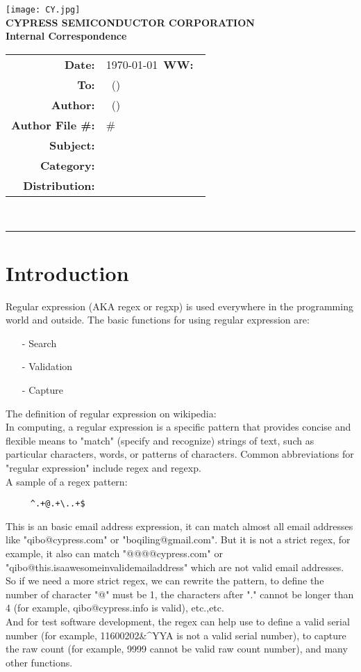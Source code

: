 \documentclass{article}
\renewcommand{\maketitle}
{
	\begin{center}
	\texttt{[image: CY.jpg]}\\
	\vspace{5 mm}
	\large
	{
	\textbf{CYPRESS SEMICONDUCTOR CORPORATION}\\
	\textbf{Internal Correspondence}\\
	}
	\vspace{1 mm}
	\hspace{0.5 in}
	\begin{tabular}{rl}
	\bf Date: & \today\ \hspace{2 in}\textbf{WW:\ }\WorkWeek\\
	\bf To: & \BossName\ (\BossInitials)\\
	\bf Author: & \Author\ (\AuthorInitials)\\
	\bf Author File \#: & \AuthorInitials\#\MemoNumber\\
	\bf Subject: & \Subject\\
	\bf Category: & \Category\\
	\bf Distribution: & \Distribution\\
	\end{tabular}
	\vspace{3 mm}\\
	\hrule
	\end{center}
	
	\thispagestyle{firstpage}
	\pagestyle{normalpage}
}
\begin{document}
\maketitle


\section{Introduction}

Regular expression (AKA regex or regxp) is used everywhere in the programming world and outside. The basic functions for using regular expression are:

\begin{itemize}
\item[-]
	Search
\item[-]
	Validation
\item[-]
	Capture	
\end{itemize}

The definition of regular expression on wikipedia: \\
In computing, a regular expression is a specific pattern that provides concise and flexible means to "match" (specify and recognize) strings of text, such as particular characters, words, or patterns of characters. Common abbreviations for "regular expression" include regex and regexp.\\
A sample of a regex pattern:

\begin{lstlisting}
	 ^.+@.+\..+$
\end{lstlisting}

This is an basic email address expression, it can match almost all email addresses like "qibo@cypress.com" or "boqiling@gmail.com". But it is not a strict regex, for example, it also can match "@@@@cypress.com" or "qibo@this.isaawesomeinvalidemailaddress" which are not valid email addresses. So if we need a more strict regex, we can rewrite the pattern, to define the number of character "@" must be 1, the characters after "." cannot be longer than 4 (for example, qibo@cypress.info is valid), etc.,etc.\\
And for test software development, the regex can help use to define a valid serial number (for example, 11600202\&\^\*YYA is not a valid serial number), to capture the raw count (for example, 9999 cannot be valid raw count number), and many other functions. 
\end{document}

